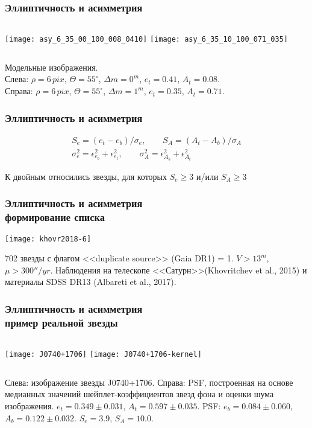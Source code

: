 \begin{frame}
\frametitle{Эллиптичность и асимметрия}
\begin{center}
\begin{columns}
	\texttt{[image: asy\_6\_35\_00\_100\_008\_0410]}
	\texttt{[image: asy\_6\_35\_10\_100\_071\_035]}
\end{columns}
\end{center}
{\footnotesize 
	Модельные изображения.\\ Слева: $\rho = 6\,pix$, $\Theta = 55^{\circ}$, $\Delta m = 0^m$, $e_t = 0.41$, $A_t = 0.08$.\\ Справа:  $\rho = 6\,pix$, $\Theta = 55^{\circ}$, $\Delta m = 1^m$, $e_t = 0.35$, $A_t = 0.71$.
}
\end{frame}


\begin{frame}
\frametitle{Эллиптичность и асимметрия}
\begin{center}
{\small
\begin{align*}
	S_e=(e_t-e_b)/\sigma_e, \qquad S_A=(A_t-A_b)/\sigma_A\\[10pt]
	\sigma_e^2=\epsilon_{e_b}^2+\epsilon_{e_t}^2, \qquad \sigma_A^2=\epsilon_{A_b}^2+\epsilon_{A_t}^2
\end{align*}
}
\end{center}
{\footnotesize
	К двойным относились звезды, для которых $S_e \geqslant 3$ и/или $S_A \geqslant 3$ 
}
\end{frame}


\begin{frame}
\frametitle{Эллиптичность и асимметрия\\{\small формирование списка}}
\begin{center}
	\texttt{[image: khovr2018-6]}
\end{center}
{\scriptsize
	702 звезды с флагом <<duplicate source>> (Gaia DR1) = 1. $V>13^m$, $\mu>300''/yr$. Наблюдения на телескопе <<Сатурн>>(Khovritchev et al., 2015) и материалы SDSS DR13 (Albareti et al., 2017).
}
\end{frame}


\begin{frame}
\frametitle{Эллиптичность и асимметрия\\{\small пример реальной звезды}}
\begin{center}
\begin{columns}
	\texttt{[image: J0740+1706]}
	\texttt{[image: J0740+1706-kernel]}
\end{columns}
\end{center}
{\scriptsize 
	Слева: изображение звезды J0740+1706. Справа: PSF, построенная на основе медианных значений шейплет-коэффициентов звезд фона и оценки шума изображения. $e_{t} =0.349\pm0.031$,  $A_{t} = 0.597\pm0.035$. PSF: $e_{b} =0.084\pm0.060$,   $A_{b} =0.122\pm0.032$. $S_e=3.9$, $S_A=10.0$.
}
\end{frame}


